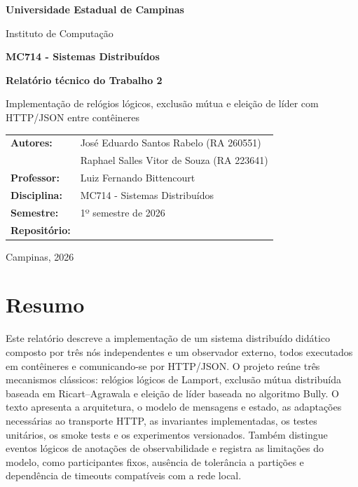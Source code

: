 \documentclass[12pt,a4paper,oneside]{article}
\newcommand{\code}[1]{\texttt{\detokenize{#1}}}
\begin{document}
\hypersetup{pageanchor=false}

\begin{titlepage}
    \centering
    \vspace*{1.7cm}

    {\large \textbf{Universidade Estadual de Campinas}\par}
    \vspace{0.2cm}
    {\large Instituto de Computação\par}
    \vspace{1.3cm}

    {\large \textbf{MC714 - Sistemas Distribuídos}\par}
    \vspace{0.8cm}
    {\LARGE \textbf{Relatório técnico do Trabalho 2}\par}
    \vspace{0.6cm}
    {\Large Implementação de relógios lógicos, exclusão mútua e eleição de líder com HTTP/JSON entre contêineres\par}

    \vfill

    \begin{tabular}{>{\bfseries}l l}
        Autores: & José Eduardo Santos Rabelo (RA 260551) \\
                 & Raphael Salles Vitor de Souza (RA 223641) \\
        Professor: & Luiz Fernando Bittencourt \\
        Disciplina: & MC714 - Sistemas Distribuídos \\
        Semestre: & 1º semestre de 2026 \\
        Repositório: & \code{RaphaelSVSouza/MC714-Trabalho-2} \\
    \end{tabular}

    \vfill
    {Campinas, 2026\par}
\end{titlepage}
\clearpage
\hypersetup{pageanchor=true}
\section*{Resumo}
Este relatório descreve a implementação de um sistema distribuído didático composto por três nós independentes e um observador externo, todos executados em contêineres e comunicando-se por HTTP/JSON. O projeto reúne três mecanismos clássicos: relógios lógicos de Lamport, exclusão mútua distribuída baseada em Ricart--Agrawala e eleição de líder baseada no algoritmo Bully. O texto apresenta a arquitetura, o modelo de mensagens e estado, as adaptações necessárias ao transporte HTTP, as invariantes implementadas, os testes unitários, os smoke tests e os experimentos versionados. Também distingue eventos lógicos de anotações de observabilidade e registra as limitações do modelo, como participantes fixos, ausência de tolerância a partições e dependência de timeouts compatíveis com a rede local.
\end{document}
